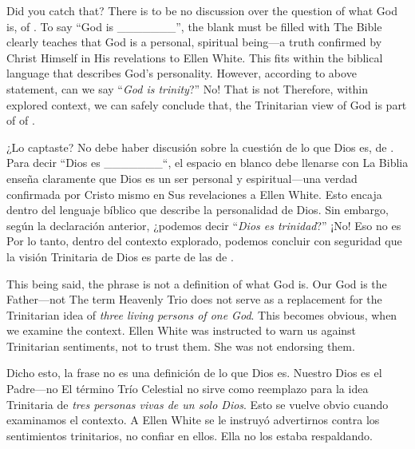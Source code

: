 Did you catch that? There is to be no discussion over the question of what God is,  of . To say “God is \_\_\_\_\_\_\_”, the blank must be filled with  The Bible clearly teaches that God is a personal, spiritual being—a truth confirmed by Christ Himself in His revelations to Ellen White. This fits within the biblical language that describes God’s personality. However, according to above statement, can we say “\textit{God is trinity}?” No! That is not  Therefore, within explored context, we can safely conclude that, the Trinitarian view of God is part of  of .


¿Lo captaste? No debe haber discusión sobre la cuestión de lo que Dios es,  de . Para decir “Dios es \_\_\_\_\_\_\_“, el espacio en blanco debe llenarse con  La Biblia enseña claramente que Dios es un ser personal y espiritual—una verdad confirmada por Cristo mismo en Sus revelaciones a Ellen White. Esto encaja dentro del lenguaje bíblico que describe la personalidad de Dios. Sin embargo, según la declaración anterior, ¿podemos decir “\textit{Dios es trinidad}?” ¡No! Eso no es  Por lo tanto, dentro del contexto explorado, podemos concluir con seguridad que la visión Trinitaria de Dios es parte de las  de .


This being said, the phrase  is not a definition of what God is. Our God is the Father—not  The term Heavenly Trio does not serve as a replacement for the Trinitarian idea of \textit{three living persons of one God}. This becomes obvious, when we examine the context. Ellen White was instructed to warn us against Trinitarian sentiments, not to trust them. She was not endorsing them.


Dicho esto, la frase  no es una definición de lo que Dios es. Nuestro Dios es el Padre—no  El término Trío Celestial no sirve como reemplazo para la idea Trinitaria de \textit{tres personas vivas de un solo Dios}. Esto se vuelve obvio cuando examinamos el contexto. A Ellen White se le instruyó advertirnos contra los sentimientos trinitarios, no confiar en ellos. Ella no los estaba respaldando.


